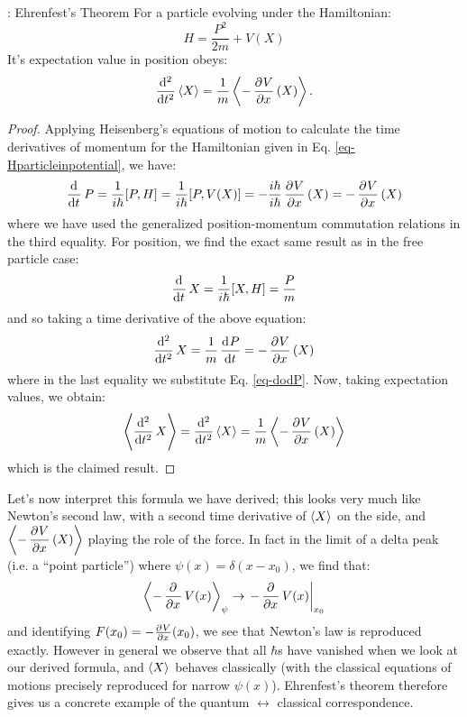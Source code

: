 \begin{thmbox}{: Ehrenfest's Theorem}
    For a particle evolving under the Hamiltonian:
    \begin{equation}\label{eq-Hparticleinpotential}
        H = \frac{P^2}{2m} + V(X)
    \end{equation}
    It's expectation value in position obeys:
    \begin{equation}
        \dod[2]{}{t}\avg{X} = \frac{1}{m}\avg{-\dpd{V}{x}(X)}.
    \end{equation}
\end{thmbox}
\begin{proof}
    Applying Heisenberg's equations of motion to calculate the time derivatives of momentum for the Hamiltonian given in Eq. \eqref{eq-Hparticleinpotential}, we have:
    \begin{equation}\label{eq-dodP}
        \dod{}{t}P = \frac{1}{i\hbar}[P, H] = \frac{1}{i\hbar}[P, V(X)] = -\frac{i\hbar}{i\hbar}\dpd{V}{x}(X) = -\dpd{V}{x}(X)
    \end{equation}
    where we have used the generalized position-momentum commutation relations in the third equality. For position, we find the exact same result as in the free particle case:
    \begin{equation}
        \dod{}{t}X = \frac{1}{i\hbar}[X, H] = \frac{P}{m}
    \end{equation}
    and so taking a time derivative of the above equation:
    \begin{equation}
        \dod[2]{}{t}X = \frac{1}{m}\dod{P}{t} = -\dpd{V}{x}(X)
    \end{equation}
    where in the last equality we substitute Eq. \eqref{eq-dodP}. Now, taking expectation values, we obtain:
    \begin{equation}
        \avg{\dod[2]{}{t}X} = \dod[2]{}{t}\avg{X} = \frac{1}{m}\avg{-\dpd{V}{x}(X)}
    \end{equation}
    which is the claimed result.
\end{proof}

Let's now interpret this formula we have derived; this looks very much like Newton's second law, with a second time derivative of $\left< X \right>$ on the side, and $\avg{-\dpd{V}{x}(X)}$ playing the role of the force. In fact in the limit of a delta peak (i.e. a ``point particle'') where $\psi(x) = \delta(x - x_0)$, we find that:
\begin{equation}
    \avg{-\dpd{}{x}V(x)}_\psi \to \left.-\dpd{}{x}V(x)\right|_{x_0}
\end{equation}
and identifying $F(x_0) = -\pd{V}{x}(x_0)$, we see that Newton's law is reproduced exactly. However in general we observe that all $\hbar$s have vanished when we look at our derived formula, and $\left< X \right>$ behaves classically (with the classical equations of motions precisely reproduced for narrow $\psi(x)$). Ehrenfest's theorem therefore gives us a concrete example of the quantum $\leftrightarrow$ classical correspondence.

